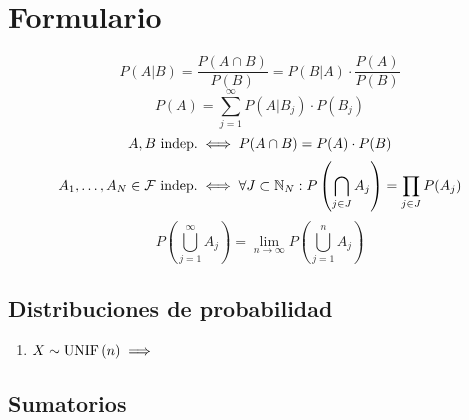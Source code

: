 
\section{Formulario}

\[P(A|B)=\frac{P(A\cap B)}{P(B)}=P(B|A)\cdot\frac{P(A)}{P(B)}\]
\[P(A) = \sum_{j=1}^\infty P(A|B_j)\cdot P(B_j)\]
\[A, B \text{ indep.} \iff P(A\cap B)=P(A)\cdot P(B)\]
\[A_1, \dots, A_N \in \mathcal{F}\text{ indep.} \iff \forall J \subset \mathbb{N}_N: P\left(\bigcap_{j\in J} A_j\right)=\prod_{j\in J}P(A_j)\]
\[P\left(\bigcup_{j=1}^\infty A_j\right)=\lim_{n\rightarrow\infty}P\left(\bigcup_{j=1}^n A_j\right)\]
\subsection{Distribuciones de probabilidad}
\begin{enumerate}
	\item $X \sim \operatorname{UNIF}\left(n\right) \implies $
\end{enumerate}
\subsection{Sumatorios}